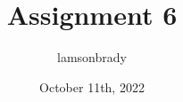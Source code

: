 \usepackage[utf8]{inputenc}

\title{Assignment 6}
\author{lamsonbrady}
\date{October 11th, 2022}

\usepackage{parskip}
\usepackage[makeroom]{cancel}

\usepackage{fancyhdr}
\pagestyle{fancy}

\usepackage{amsmath}
\usepackage{amssymb}

\newcommand{\psmall}[1]{
	\left(\begin{smallmatrix}
		#1
	\end{smallmatrix} \right)
}

\newcommand{\genpmat}[1]{
	\ensuremath{
		\begin{pmatrix}
			#1
		\end{pmatrix}
	}
}
\newcommand{\genericmat}[2]{
	\ensuremath{
		\begin{#1matrix}
			#2
		\end{#1matrix}
	}
}

\newcommand{\genericvec}{
	\ensuremath{
		\left\{\vec{e_1}, \vec{e_2}, \dots, \vec{e_n} \right\}
	}
}

\newcommand{\bb}{\mathbb}
\newcommand{\R}{\mathbb{R}}
\renewcommand{\P}{\mathbb{P}}
\newcommand{\Z}{\mathbb{Z}}

\newcommand*{\myprime}{^{\prime}\mkern-1.2mu}
\newcommand*{\mydprime}{^{\prime\prime}\mkern-1.2mu}
\newcommand*{\mytrprime}{^{\prime\prime\prime}\mkern-1.2mu}

